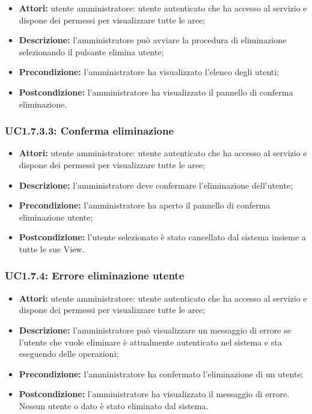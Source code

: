 \begin{itemize}
    \item \textbf{Attori:} utente amministratore: utente autenticato che ha accesso al servizio e dispone dei permessi per visualizzare tutte le aree;
    \item \textbf{Descrizione:} l'amministratore può avviare la procedura di eliminazione selezionando il pulsante elimina utente;
    \item \textbf{Precondizione:} l'amministratore ha visualizzato l'elenco degli utenti;
    \item \textbf{Postcondizione:} l'amministratore ha visualizzato il pannello di conferma eliminazione.
\end{itemize}

\subsubsection{UC1.7.3.3: Conferma eliminazione}

\begin{itemize}
    \item \textbf{Attori:} utente amministratore: utente autenticato che ha accesso al servizio e dispone dei permessi per visualizzare tutte le aree;
    \item \textbf{Descrizione:} l'amministratore deve confermare l'eliminazione dell'utente;
    \item \textbf{Precondizione:} l'amministratore ha aperto il pannello di conferma eliminazione utente;
    \item \textbf{Postcondizione:} l'utente selezionato è stato cancellato dal sistema insieme a tutte le sue View\gloss{}.
\end{itemize}

\subsubsection{UC1.7.4: Errore eliminazione utente}


\begin{itemize}
    \item \textbf{Attori:} utente amministratore: utente autenticato che ha accesso al servizio e dispone dei permessi per visualizzare tutte le aree;
    \item \textbf{Descrizione:} l'amministratore può visualizzare un messaggio di errore se l'utente che vuole eliminare è attualmente autenticato nel sistema e sta eseguendo delle operazioni;
    \item \textbf{Precondizione:} l'amministratore ha confermato l'eliminazione di un utente;
    \item \textbf{Postcondizione:} l'amministratore ha visualizzato il messaggio di errore. Nessun utente o dato è stato eliminato dal sistema.
\end{itemize}

